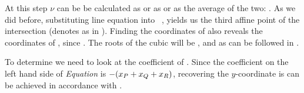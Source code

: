 At this step $\nu$ can be be calculated as  
or as or as the average of the two:  
. As we did before, substituting  line equation \mathFormulaEllipticCurveLineEquation into \EquationShortWeierstrassEquation~, yields us the third affine point of the intersection (denotes as  in ). Finding the coordinates of   also reveals the
coordinates of , since . The roots of the cubic will be ,  and   as can be followed in .


To determine  we need to look at the coefficient of  . Since the coefficient on the left hand side of \textit{Equation } is $-({x}_{P} + {x}_{Q} + {x}_{R})$, recovering the $y$-coordinate is can be achieved in accordance with .

